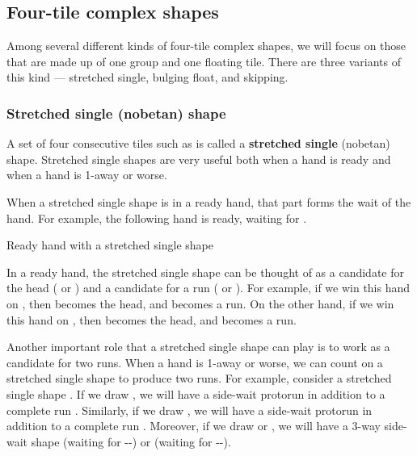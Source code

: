 \subsection{Four-tile complex shapes} 
Among several different kinds of four-tile complex shapes, we will focus on those that are made up of one group and one floating tile. There are three variants of this kind --- stretched single, bulging float, and skipping.

\subsubsection{Stretched single ({\jap nobetan}) shape} \label{sec:nobetan}
A set of four consecutive tiles such as {\LARGE{}} is called a {\bf stretched single} ({\jap nobetan}) shape. Stretched single shapes are very useful both when a hand is ready and when a hand is 1-away or worse. 

\bigskip
When a stretched single shape is in a ready hand, that part forms the wait of the hand. For example, the following hand is ready, waiting for {\LARGE{} }.
\bigskip
\begin{itembox}[r]{Ready hand with a stretched single shape}
\bp
{}\zhong\zhong\zhong
\ep 
\end{itembox}
In a ready hand, the stretched single shape can be thought of as a candidate for the head ({\LARGE{}} or {\LARGE{}}) and a candidate for a run ({\LARGE{}} or {\LARGE{}}). For example, if we win this hand on {\LARGE{}}, then {\LARGE{}} becomes the head, and {\LARGE{}} becomes a run. On the other hand, if we win this hand on {\LARGE{}}, then {\LARGE{}} becomes the head, and {\LARGE{}} becomes a run. 

\bigskip

Another important role that a stretched single shape can play is to work as a candidate for two runs. When a hand is 1-away or worse, we can count on a stretched single shape to produce two runs. 
For example, consider a stretched single shape {\LARGE{}}. 
If we draw {\LARGE{}}, we will have a side-wait protorun {\LARGE{}} in addition to a complete run {\LARGE{}}. Similarly, if we draw {\LARGE{}}, we will have a side-wait protorun {\LARGE{}} in addition to a complete run {\LARGE{}}. Moreover, if we draw {\LARGE{}} or {\LARGE{}}, we will have a 3-way side-wait shape {\LARGE{}} (waiting for {\LARGE{}--}) or {\LARGE{}} (waiting for {\LARGE{}--}). 

